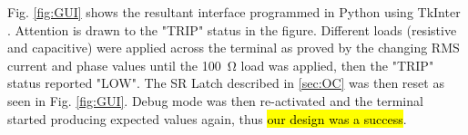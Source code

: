 Fig. \ref{fig:GUI} shows the resultant interface programmed in Python using TkInter \cite{TkInter}. Attention is drawn to the "TRIP" status in the figure. Different loads (resistive and capacitive) were applied across the terminal as proved by the changing RMS current and phase values until the \SI{100}{\ohm} load was applied, then the "TRIP" status reported "LOW". The SR Latch described in \ref{sec:OC} was then reset as seen in  Fig. \ref{fig:GUI}. Debug mode was then re-activated and the terminal started producing expected values again, thus \hl{our design was a success}.
































